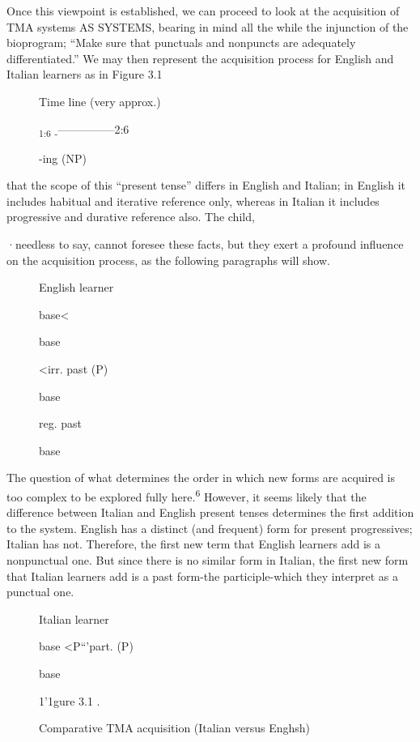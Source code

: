 Once this viewpoint is established, we can proceed to look at the acquisition of TMA systems AS SYSTEMS, bearing in mind all the while the injunction of the bioprogram; ``Make sure that punctuals and nonpuncts are adequately differentiated.'' We may then represent the acquisition process for English and Italian learners as in Figure
3.1%


\begin{figure}
Time line (very approx.)

\textsubscript{1}\textsubscript{:6 }\textsubscript{-}---------------2:6

-ing (NP)
 
\end{figure}

that the scope of this ``present tense'' differs in English and Italian; in English it includes habitual and iterative reference only, whereas in Italian it includes progressive and durative reference also. The child,

·needless to say, cannot foresee these facts, but they exert a profound influence on the acquisition process, as the following paragraphs will show.


\begin{figure}
English learner

base{\textless}

base

{\textless}irr. past (P)

base

reg. past

base
\end{figure}


The question of what determines the order in which new forms
are acquired is too complex to be explored fully here.\textsuperscript{6} However, it seems likely that the difference between Italian and English present tenses determines the first addition to the system. English has a dis\-tinct (and frequent) form for present progressives; Italian has not. Therefore, the first new term that English learners add is a nonpunctual one. But since there is no similar form in Italian, the first new form that Italian learners add is a past form-the participle-which they interpret as a punctual one.

\begin{figure}

Italian learner

base {\textless}P``'part. (P)

base

1'1gure 3.1 .

Comparative TMA acquisition (Italian versus Enghsh)
\end{figure}



